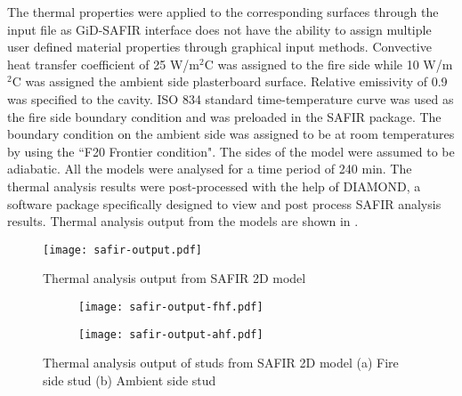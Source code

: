 The thermal properties were applied to the corresponding surfaces through the input file as GiD-SAFIR interface does not have the ability to assign multiple user defined material properties through graphical input methods. Convective heat transfer coefficient of 25 W/m$^2$\degree C was assigned to the fire side while 10 W/m$^2$\degree C was assigned the ambient side plasterboard surface. Relative emissivity of 0.9 was specified to the cavity. ISO 834 standard time-temperature curve was used as the fire side boundary condition and was preloaded in the SAFIR package. The boundary condition on the ambient side was assigned to be at room temperatures by using the ``F20 Frontier condition". The sides of the model were assumed to be adiabatic. All the models were analysed for a time period of 240 min. The thermal analysis results were post-processed with the help of DIAMOND, a software package specifically designed to view and post process SAFIR analysis results. Thermal analysis output from the models are shown in .
\begin{figure}[!htbp]
	\centering
	\texttt{[image: safir-output.pdf]}
	\caption{Thermal analysis output from SAFIR 2D model}
	\label{fig:safir-output}
\end{figure}
\begin{figure}[!htbp]
	\centering
	\begin{subfigure}[b]{0.4\textwidth}
		\centering
		\texttt{[image: safir-output-fhf.pdf]}
		\caption{}
		\label{subfig:safir-output-fhf}
	\end{subfigure}
	\begin{subfigure}[b]{0.4\textwidth}
		\centering
		\texttt{[image: safir-output-ahf.pdf]}
		\caption{}
		\label{subfig:safir-output-ahf}
	\end{subfigure}
	   \caption{Thermal analysis output of studs from SAFIR 2D model (a) Fire side stud (b) Ambient side stud}
	   \label{fig:safir-output-studs}
\end{figure}

